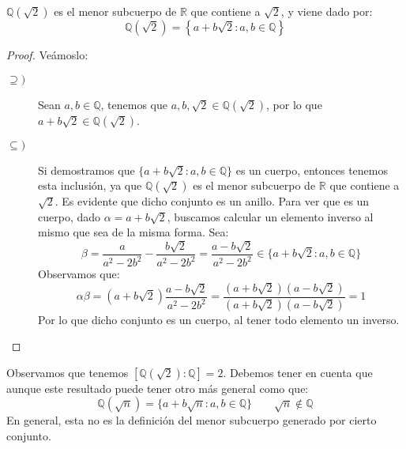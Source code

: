 \begin{ejemplo}
    $\mathbb{Q}(\sqrt{2})$ es el menor subcuerpo de $\mathbb{R}$ que contiene a $\sqrt{2}$, y viene dado por:
    \begin{equation*}
        \mathbb{Q}(\sqrt{2}) = \left\{a+b\sqrt{2} : a,b\in \mathbb{Q}\right\}
    \end{equation*}
    \begin{proof}
        Veámoslo:
        \begin{description}
            \item [$\supseteq)$] Sean $a,b\in \mathbb{Q}$, tenemos que $a,b,\sqrt{2}\in \mathbb{Q}(\sqrt{2})$, por lo que $a+b\sqrt{2}\in \mathbb{Q}(\sqrt{2})$.
            \item [$\subseteq)$] Si demostramos que $\{a+b\sqrt{2}:a,b\in \mathbb{Q}\}$ es un cuerpo, entonces tenemos esta inclusión, ya que $\mathbb{Q}(\sqrt{2})$ es el menor subcuerpo de $\mathbb{R}$ que contiene a $\sqrt{2}$. Es evidente que dicho conjunto es un anillo. Para ver que es un cuerpo, dado $\alpha=a+b\sqrt{2}$, buscamos calcular un elemento inverso al mismo que sea de la misma forma. Sea:
                \begin{equation*}
                \beta = \dfrac{a}{a^2-2b^2} - \dfrac{b\sqrt{2}}{a^2-2b^2} = \dfrac{a-b\sqrt{2}}{a^2-2b^2} \in \{a+b\sqrt{2}:a,b\in \mathbb{Q}\}
                \end{equation*}
                Observamos que:
                \begin{equation*}
                    \alpha \beta = \left(a+b\sqrt{2}\right) \dfrac{a-b\sqrt{2}}{a^2-2b^2} = \dfrac{\left(a+b\sqrt{2}\right)\left(a-b\sqrt{2}\right)}{\left(a+b\sqrt{2}\right)\left(a-b\sqrt{2}\right)} = 1
                \end{equation*}
                Por lo que dicho conjunto es un cuerpo, al tener todo elemento un inverso.
        \end{description}
    \end{proof}
    Observamos que tenemos $\left[\mathbb{Q}(\sqrt{2}): \mathbb{Q}\right] = 2$. Debemos tener en cuenta que aunque este resultado puede tener otro más general como que:
    \begin{equation*}
        \mathbb{Q}(\sqrt{n}) = \{a+b\sqrt{n}:a,b\in \mathbb{Q}\} \qquad \sqrt{n}\notin \mathbb{Q}
    \end{equation*}
    En general, esta no es la definición del menor subcuerpo generado por cierto conjunto.
\end{ejemplo}

